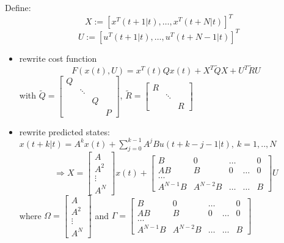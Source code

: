 Define: 
\begin{equation}
X:= [x^T(t+1|t), \dots, x^T(t+N|t)]^T
\end{equation}
\begin{equation}
U:= [u^T(t+1|t), \dots, u^T(t+N-1|t)]^T
\end{equation}
\begin{itemize}
\item rewrite cost function
\begin{equation}\label{cost_function}
F(x(t),U) = x^T(t)Qx(t) + X^T\tilde{Q}X + U^T\tilde{R}U
\end{equation}
with $\tilde{Q} = 
\begin{bmatrix}
    Q  & \  & \ \\
    \  &\ddots & \\
     \  & \ & Q \\
     \ & \ & \ & P     
\end{bmatrix} $, 
$\tilde{R} = 
\begin{bmatrix}
    R  & \  & \ \\
    \  &\ddots & \\
     \  & \ & R     
\end{bmatrix} $
\item rewrite predicted states: $x(t+k|t) = A^kx(t) + \sum_{j=0}^{k-1}A^jBu(t+k-j-1|t), \ k=1,..,N$
\begin{equation}\label{rewritten_state_input}
\Rightarrow X=\begin{bmatrix}
   A \\
   A^2 \\
   \vdots \\
   A^N   
\end{bmatrix}x(t) +\begin{bmatrix}
    B  & 0 & \dots &  & 0 \\
    AB & B & 0 & \dots & 0\\
    \hdots & & & & \\
    A^{N-1}B  & A^{N-2}B & \dots & \dots & B     
\end{bmatrix}U
\end{equation}
where $\Omega = \begin{bmatrix}
   A \\
   A^2 \\
   \vdots \\
   A^N   
\end{bmatrix}$ and $\Gamma = \begin{bmatrix}
    B  & 0 & \dots &  & 0 \\
    AB & B & 0 & \dots & 0\\
    \hdots & & & & \\
    A^{N-1}B  & A^{N-2}B & \dots & \dots & B     
\end{bmatrix}$


\end{itemize}
